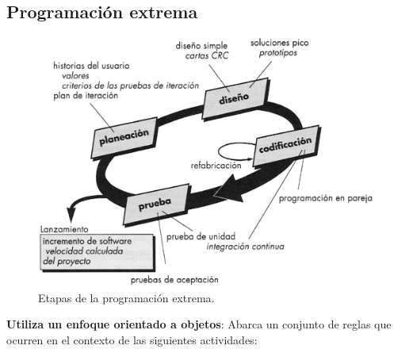 \subsection{Programación extrema}
 \begin{figure}[H]
  \centering
  \includegraphics[width=0.7\linewidth]{Resources/programacionExtrema.jpg}
  \caption{Etapas de la programación extrema.}
  \label{fig:programacionExtrema}
\end{figure}
\textbf{Utiliza un enfoque orientado a objetos}: Abarca un conjunto de reglas que ocurren en el contexto de las siguientes actividades:
